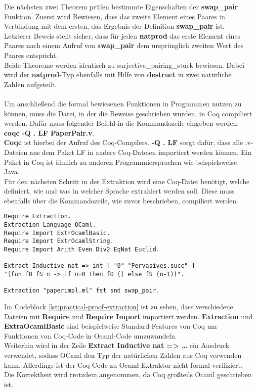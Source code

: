 Die nächsten zwei Theorem prüfen bestimmte Eigenschaften der \textbf{swap\_pair} Funktion. Zuerst wird Bewiesen, dass das zweite Element eines Paares in Verbindung mit dem ersten, das Ergebnis der Definition \textbf{swap\_pair} ist. Letzterer Beweis stellt sicher, dass für jeden \textbf{natprod} das erste Element eines Paares nach einem Aufruf von \textbf{swap\_pair} dem ursprünglich zweiten Wert des Paares entspricht.\\
Beide Theoreme werden identisch zu surjective\_pairing\_stuck bewiesen. Dabei wird der \textbf{natprod}-Typ ebenfalls mit Hilfe von \textbf{destruct} in zwei natürliche Zahlen aufgeteilt.\\
\\
Um anschließend die formal bewiesenen Funktionen in Programmen nutzen zu können, muss die Datei, in der die Beweise geschrieben wurden, in Coq compiliert werden. Dafür muss folgender Befehl in die Kommandozeile eingeben werden:
\textbf{coqc -Q . LF PaperPair.v}. \\
\textbf{Coqc} ist hierbei der Aufruf des Coq-Compilers. \textbf{-Q . LF} sorgt dafür, dass alle .v-Dateien aus dem Paket LF in andere Coq-Dateien importiert werden können. Ein Paket in Coq ist ähnlich zu anderen Programmiersprachen wie beispielsweise Java.
\\
Für den nächsten Schritt in der Extraktion wird eine Coq-Datei benötigt, welche definiert, wie und was in welcher Sprache extrahiert werden soll. Diese muss ebenfalls über die Kommandozeile, wie zuvor beschrieben, compiliert werden.
\begin{lstlisting}[language=coq,firstnumber=1,caption=Coq Code extrahieren,label=lst:practical-proof-extraction]
Require Extraction.
Extraction Language OCaml.
Require Import ExtrOcamlBasic.
Require Import ExtrOcamlString.
Require Import Arith Even Div2 EqNat Euclid.

Extract Inductive nat => int [ "0" "Pervasives.succ" ]
"(fun fO fS n -> if n=0 then fO () else fS (n-1))".

Extraction "paperimpl.ml" fst snd swap_pair.
\end{lstlisting}
Im Codeblock \ref{lst:practical-proof-extraction} ist zu sehen, dass verschiedene Dateien mit \textbf{Require} und \textbf{Require Import} importiert werden. \textbf{Extraction} und \textbf{ExtraOcamlBasic} sind beispielweise Standard-Features von Coq um Funktionen von Coq-Code in Ocaml-Code umzuwandeln.\\
Weiterhin wird in der Zeile \textbf{Extract Inductive nat => \dots} ein Ausdruck verwendet, sodass OCaml den Typ der natürlichen Zahlen aus Coq verwenden kann. Allerdings ist der Coq-Code zu Ocaml Extraktor nicht formal verifiziert. Die Korrektheit wird trotzdem angenommen, da Coq großteils Ocaml geschrieben ist.
